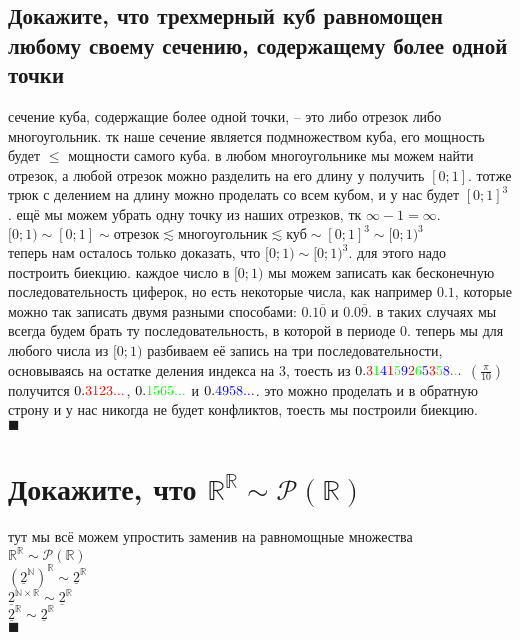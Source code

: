 \documentclass{article}
\newcommand{\ds}{\displaystyle}
\newcommand{\N}{\mathbb{N}}
\newcommand{\R}{\mathbb{R}}
\newcommand{\range}{\underline}
\renewcommand{\f}{\frac}
\renewcommand{\l}{\left}
\renewcommand{\r}{\right}
\renewcommand{\P}[1]{\mathcal{P}\l(#1\r)}
\newcommand{\red}[1]{{\color{red}{#1}}}
\newcommand{\green}[1]{{\color{green}{#1}}}
\newcommand{\blue}[1]{{\color{blue}{#1}}}
\begin{document}
  \subsection{Докажите, что трехмерный куб равномощен любому своему сечению, содержащему более одной точки}
  сечение куба, содержащие более одной точки, -- это либо отрезок либо многоугольник.
  тк наше сечение является подмножеством куба, его мощность будет $\leq$ мощности самого куба.
  в любом многоугольнике мы можем найти отрезок, а любой отрезок можно разделить на его длину у получить $[0;1]$.
  тотже трюк с делением на длину можно проделать со всем кубом, и у нас будет $[0;1]^3$.
  ещё мы можем убрать одну точку из наших отрезков, тк $\infty-1 = \infty$.
  \\ $\ds [0;1) \sim [0;1] \sim \text{отрезок} \lesssim \text{многоугольник} \lesssim \text{куб} \sim [0;1]^3 \sim [0;1)^3 $ \\
  теперь нам осталось только доказать, что $\ds [0;1) \sim [0;1)^3 $.
  для этого надо построить биекцию.
  каждое число в $[0;1)$ мы можем записать как бесконечную последовательность циферок,
  но есть некоторые числа, как например $0.1$, которые можно так записать двумя разными способами:
  $0.1\overline{0}$ и $0.0\overline{9}$.
  в таких случаях мы всегда будем брать ту последовательность, в которой в периоде $0$.
  теперь мы для любого числа из $[0;1)$ разбиваем её запись на три последовательности,
  основываясь на остатке деления индекса на $3$, тоесть из
  $0.\red{3}\green{1}\blue{4}\red{1}\green{5}\blue{9}\red{2}\green{6}\blue{5}\red{3}\green{5}\blue{8}\red{.}\green{.}\blue{.}$ $\l(\f{\pi}{10}\r)$
  получится $0.\red{3123...}$, $0.\green{1565...}$ и $0.\blue{4958...}$.
  это можно проделать и в обратную строну и у нас никогда не будет конфликтов, тоесть мы построили биекцию. \\
  $\blacksquare$

  \section{Докажите, что $\R^\R \sim \P{\R}$}
  тут мы всё можем упростить заменив на равномощные множества \\
  $\R^\R \sim \P{\R}$ \\
  $\l(\range{2}^\N\r)^\R \sim \range{2}^\R$ \\
  $\range{2}^{\N\times\R} \sim \range{2}^\R$ \\
  $\range{2}^\R \sim \range{2}^\R$ \\
  $\blacksquare$
\end{document}
